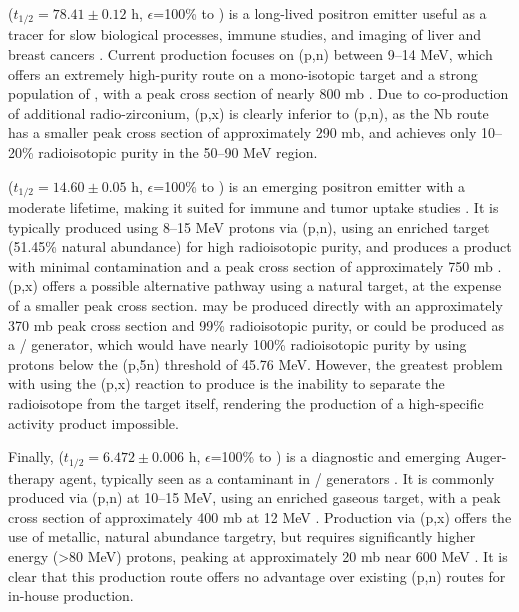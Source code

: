  ($t_{1/2}=78.41\pm0.12$ h, $\epsilon$=100\% to   \cite{Singh2013}) is a long-lived positron emitter useful as a tracer for slow biological processes, immune studies, and imaging of liver and  breast cancers \cite{Verel2003,Dijkers2009,Dijkers2010}.
Current production focuses on (p,n) between 9--14 MeV, which offers an extremely high-purity route on a mono-isotopic target and a strong population of , with a peak cross section of nearly 800 mb   \cite{PhysRevC.38.1624,Omara2009}.
Due to co-production of additional  radio-zirconium,  (p,x) is clearly inferior to  (p,n), as the Nb route has a smaller peak cross section of approximately 290 mb, and achieves only 10--20\% radioisotopic purity in the 50--90 MeV region.




 ($t_{1/2}=14.60 \pm 0.05$ h, $\epsilon$=100\% to   \cite{Browne1997}) is an emerging positron emitter with a moderate lifetime, making it suited for immune and tumor uptake studies    \cite{Busse2002,Radchenko2012}.
It is typically produced using 8--15 MeV protons via (p,n), using an enriched target (51.45\% natural abundance) for high radioisotopic purity, and produces a product with minimal contamination and a peak cross section of approximately 750 mb  \cite{Busse2002}.
(p,x) offers a possible alternative pathway using a natural target, at the expense of a smaller peak cross section.
 may be produced directly with an approximately 370 mb peak cross section and 99\% radioisotopic purity, or could be produced as a / generator, which would have nearly 100\% radioisotopic purity by using protons below the (p,5n) threshold of 45.76 MeV.
However, the greatest problem with using the (p,x) reaction to produce  is the inability to separate the radioisotope from the target itself, rendering the production of a high-specific activity product impossible.  







Finally,  ($t_{1/2}=6.472\pm0.006$ h, $\epsilon$=100\% to   \cite{Tuli2003}) is a diagnostic and emerging Auger-therapy agent, typically seen as a contaminant in / generators 
\cite{Kovacs1991}.
It is commonly produced via (p,n) at 10--15 MeV, using an enriched  gaseous target, with a peak cross section of approximately 400 mb at 12 MeV \cite{Kovacs1991}.
Production via (p,x) offers the use of metallic, natural abundance targetry, but requires significantly higher energy (\textgreater 80 MeV) protons, peaking at approximately 20 mb near 600 MeV \cite{Titarenko2011}.
It is clear that this production route offers no advantage over existing (p,n) routes for in-house production.


